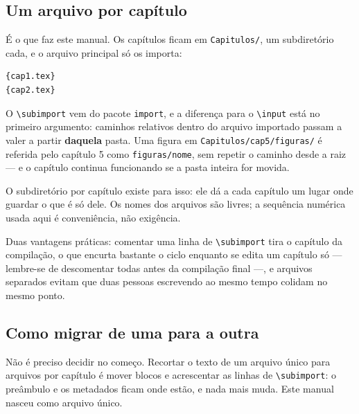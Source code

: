 \subsection{Um arquivo por capítulo}\label{ssc:arquivo-por-capitulo}

É o que faz este manual. Os capítulos ficam em \texttt{Capitulos/}, um subdiretório cada, e o
arquivo principal só os importa:

\begin{Verbatim}[fontsize=\small]
{cap1.tex}
{cap2.tex}
\end{Verbatim}

O \texttt{\textbackslash subimport} vem do pacote \texttt{import}, e a diferença para o
\texttt{\textbackslash input} está no primeiro argumento: caminhos relativos dentro do arquivo
importado passam a valer a partir \textbf{daquela} pasta. Uma figura em
\texttt{Capitulos/cap5/figuras/} é referida pelo capítulo 5 como \texttt{figuras/nome}, sem
repetir o caminho desde a raiz --- e o capítulo continua funcionando se a pasta inteira for movida.

O subdiretório por capítulo existe para isso: ele dá a cada capítulo um lugar onde guardar o que é
só dele. Os nomes dos arquivos são livres; a sequência numérica usada aqui é conveniência, não
exigência.

Duas vantagens práticas: comentar uma linha de \texttt{\textbackslash subimport} tira o capítulo
da compilação, o que encurta bastante o ciclo enquanto se edita um capítulo só --- lembre-se de
descomentar todas antes da compilação final ---, e arquivos separados evitam que duas pessoas
escrevendo ao mesmo tempo colidam no mesmo ponto.

\subsection{Como migrar de uma para a outra}\label{ssc:migrar-organizacao}

Não é preciso decidir no começo. Recortar o texto de um arquivo único para arquivos por capítulo é
mover blocos e acrescentar as linhas de \texttt{\textbackslash subimport}: o preâmbulo e os
metadados ficam onde estão, e nada mais muda. Este manual nasceu como arquivo único.

